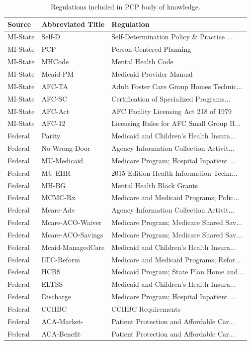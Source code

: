 \documentclass[
]{book}
\begin{document}
\begin{table}

\caption{\label{tab:unnamed-chunk-6}Regulations included in PCP body of knowledge.}
\centering
\begin{tabular}[t]{l|l|l}
\hline
Source & Abbreviated Title & Regulation\\
\hline
MI-State & Self-D & Self-Determination Policy \& Practice ...\\
\hline
MI-State & PCP & Person-Centered Planning\\
\hline
MI-State & MHCode & Mental Health Code\\
\hline
MI-State & Mcaid-PM & Medicaid Provider Manual\\
\hline
MI-State & AFC-TA & Adult Foster Care Group Homes Technic...\\
\hline
MI-State & AFC-SC & Certification of Specialized Programs...\\
\hline
MI-State & AFC-Act & AFC Facility Licensing Act 218 of 1979\\
\hline
MI-State & AFC-12 & Licensing Rules for AFC Small Group H...\\
\hline
Federal & Parity & Medicaid and Children's Health Insura...\\
\hline
Federal & No-Wrong-Door & Agency Information Collection Activit...\\
\hline
Federal & MU-Medicaid & Medicare Program; Hospital Inpatient ...\\
\hline
Federal & MU-EHR & 2015 Edition Health Information Techn...\\
\hline
Federal & MH-BG & Mental Health Block Grants\\
\hline
Federal & MCMC-Rx & Medicare and Medicaid Programs; Polic...\\
\hline
Federal & Mcare-Adv & Agency Information Collection Activit...\\
\hline
Federal & Mcare-ACO-Waiver & Medicare Program; Medicare Shared Sav...\\
\hline
Federal & Mcare-ACO-Savings & Medicare Program; Medicare Shared Sav...\\
\hline
Federal & Mcaid-ManagedCare & Medicaid and Children's Health Insura...\\
\hline
Federal & LTC-Reform & Medicare and Medicaid Programs; Refor...\\
\hline
Federal & HCBS & Medicaid Program; State Plan Home and...\\
\hline
Federal & ELTSS & Medicaid and Children's Health Insura...\\
\hline
Federal & Discharge & Medicare Program; Hospital Inpatient ...\\
\hline
Federal & CCHBC & CCHBC Requirements\\
\hline
Federal & ACA-Market- & Patient Protection and Affordable Car...\\
\hline
Federal & ACA-Benefit & Patient Protection and Affordable Car...\\
\hline
\end{tabular}
\end{table}
\end{document}
